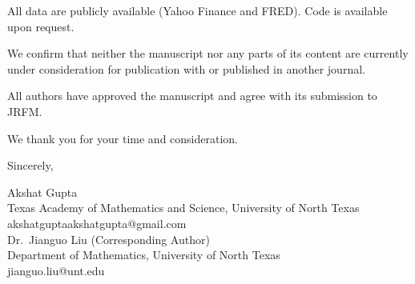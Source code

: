 \documentclass[12pt]{article}
\begin{document}
All data are publicly available (Yahoo Finance and FRED). Code is available upon request.

We confirm that neither the manuscript nor any parts of its content are currently under consideration for publication with or published in another journal.

All authors have approved the manuscript and agree with its submission to JRFM.

We thank you for your time and consideration.

\bigskip

Sincerely,

\bigskip\bigskip

Akshat Gupta\\
Texas Academy of Mathematics and Science, University of North Texas\\
akshatguptaakshatgupta@gmail.com\\[6pt]
Dr.\ Jianguo Liu (Corresponding Author)\\
Department of Mathematics, University of North Texas\\
jianguo.liu@unt.edu
\end{document}
